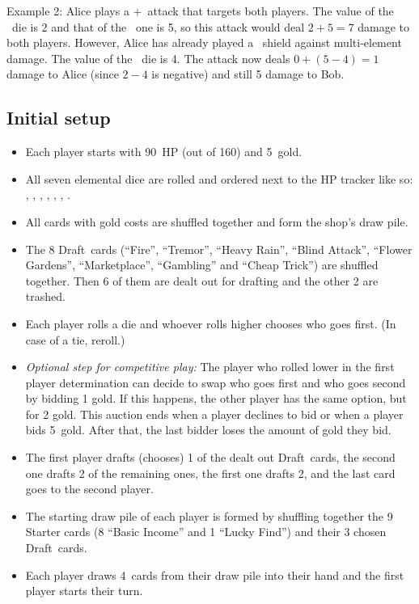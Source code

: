 \documentclass[dvipsnames,parskip,a4paper]{scrartcl}
\newcommand{\iconsize}{3.4mm}
\newcommand{\icondepth}{0.45mm}
\newcommand{\icon}[1]{\raisebox{-\icondepth}{\texttt{[image:  \#1 ]}}}
\newcommand{\chance}{\icon{icons/chance.png}}
\newcommand{\fire}{\icon{icons/fire.png}}
\newcommand{\earth}{\icon{icons/earth.png}}
\newcommand{\water}{\icon{icons/water.png}}
\newcommand{\nature}{\icon{icons/nature.png}}
\newcommand{\magic}{\icon{icons/magic.png}}
\newcommand{\gold}{\icon{icons/gold.png}}
\newcommand{\draft}{Draft}
\newcommand{\startgold}{5}
\newcommand{\handsize}{4}
\newcommand{\starthp}{90}
\newcommand{\maxhp}{160}
\begin{document}
\vspace{4pt}

Example 2: Alice plays a \water\hspace{1pt}$+$\hspace{1pt}\earth \ attack that targets both players. The value of the \water \ die is 2 and that of the \earth \ one is 5, so this attack would deal $2 + 5 = 7$ damage to both players. However, Alice has already played a \magic \ shield against multi-element damage. The value of the \magic \ die is 4. The attack now deals $0 + (5 - 4) = 1$ damage to Alice (since $2 - 4$ is negative) and still 5 damage to Bob.

\newpage

\subsection*{Initial setup}

\begin{itemize}
\item Each player starts with \starthp \ HP (out of \maxhp) and \startgold \ gold.
\item All seven elemental dice are rolled and ordered next to the HP tracker like so: \chance, \fire, \earth, \water, \nature, \gold, \magic.
\item All cards with gold costs are shuffled together and form the shop's draw pile.
\item The 8 \draft \ cards (``Fire'', ``Tremor'', ``Heavy Rain'', ``Blind Attack'', ``Flower Gardens'', ``Marketplace'', ``Gambling'' and ``Cheap Trick'') are shuffled together. Then 6 of them are dealt out for drafting and the other 2 are trashed.
\item Each player rolls a die and whoever rolls higher chooses who goes first. (In case of a tie, reroll.)
\item \textit{Optional step for competitive play:} The player who rolled lower in the first player determination can decide to swap who goes first and who goes second by bidding 1 gold. If this happens, the other player has the same option, but for 2 gold. This auction ends when a player declines to bid or when a player bids \startgold \ gold. After that, the last bidder loses the amount of gold they bid.
\item The first player drafts (chooses) 1 of the dealt out \draft \ cards, the second one drafts 2 of the remaining ones, the first one drafts 2, and the last card goes to the second player.
\item The starting draw pile of each player is formed by shuffling together the 9 Starter cards (8 ``Basic Income'' and 1 ``Lucky Find'') and their 3 chosen \draft \ cards.
\item Each player draws \handsize \ cards from their draw pile into their hand and the first player starts their turn.
\end{itemize}
\end{document}

